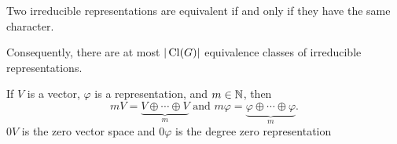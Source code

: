 		\begin{fcor}
			Two irreducible representations are equivalent if and only if they have the same character.
		\end{fcor}

		Consequently, there are at most $|\operatorname{Cl}(G)|$ equivalence classes of irreducible representations.

		\begin{definition}
			If $V$ is a vector, $\varphi$ is a representation, and $m \in \mathbb{N}$, then
			\[ mV = \underbrace{V \oplus \cdots \oplus V}_{m} \text{ and } m\varphi = \underbrace{\varphi \oplus \cdots \oplus \varphi}_{m}. \]
			$0V$ is the zero vector space and $0\varphi$ is the degree zero representation
		\end{definition}

		